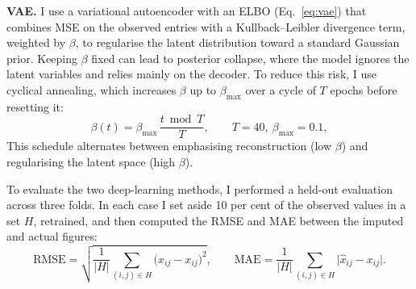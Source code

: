 \noindent \textbf{VAE.} I use a variational autoencoder with an ELBO (Eq.~\ref{eq:vae}) that combines MSE on the observed entries with a Kullback--Leibler divergence term, weighted by $\beta$, to regularise the latent distribution toward a standard Gaussian prior. Keeping $\beta$ fixed can lead to posterior collapse, where the model ignores the latent variables and relies mainly on the decoder. To reduce this risk, I use cyclical annealing, which increases $\beta$ up to $\beta_{\max}$ over a cycle of $T$ epochs before resetting it:
\begin{equation}\label{eq:beta_cyclical}
\beta(t)=\beta_{\max}\,\frac{t \bmod T}{T},\qquad T=40,\ \beta_{\max}=0.1,
\end{equation}
This schedule alternates between emphasising reconstruction (low $\beta$) and regularising the latent space (high $\beta$).

To evaluate the two deep-learning methods, I performed a held-out evaluation across three folds. In each case I set aside 10 per cent of the observed values in a set $H$, retrained, and then computed the RMSE and MAE between the imputed and actual figures:
\begin{equation}\label{eq:rmse}
\mathrm{RMSE}=\sqrt{\frac{1}{|H|}\sum_{(i,j)\in H}\bigl(\hat{x}_{ij}-x_{ij}\bigr)^2},\qquad
\mathrm{MAE}=\frac{1}{|H|}\sum_{(i,j)\in H}\bigl|\hat{x}_{ij}-x_{ij}\bigr|.
\end{equation}

